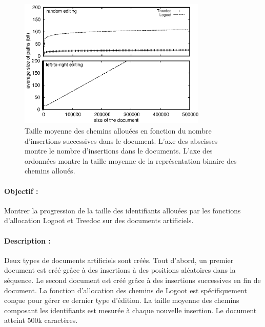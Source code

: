 \begin{figure}
  \begin{center}
    \includegraphics[width=0.8\textwidth]{img/lseq/motivationartificial.eps}
    \caption{\label{repl:img:motivationartificial}Taille moyenne des chemins
      allouées en fonction du nombre d'insertions successives dans le
      document. L'axe des abscisses montre le nombre d'insertions dans le
      documents. L'axe des ordonnées montre la taille moyenne de la
      représentation binaire des chemins alloués.}
  \end{center}
\end{figure}

\paragraph{Objectif :} Montrer la progression de la taille des identifiants
allouées par les fonctions d'allocation Logoot et Treedoc sur des documents
artificiels.

\paragraph{Description :} Deux types de documents artificiels sont créés. Tout
d'abord, un premier document est créé grâce à des insertions à des positions
aléatoires dans la séquence. Le second document est créé grâce à des insertions
successives en fin de document. La fonction d'allocation des chemins de Logoot
est spécifiquement conçue pour gérer ce dernier type d'édition. La taille
moyenne des chemins composant les identifiants est mesurée à chaque nouvelle
insertion. Le document atteint 500k caractères.

